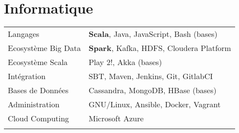 \documentclass[11pt,a4paper]{moderncv}
\begin{document}
\section{Informatique}
\begin{tabular}{ll}
  \vspace{0.1cm}
  \hspace{0.1cm} Langages & \hspace{0.5cm} \textbf{Scala}, Java, JavaScript, Bash (bases) \\ \vspace{0.1cm}
  \hspace{0.1cm} Ecosystème Big Data & \hspace{0.5cm} \textbf{Spark}, Kafka, HDFS, Cloudera Platform \\ \vspace{0.1cm}
  \hspace{0.1cm} Ecosystème Scala & \hspace{0.5cm} Play 2!, Akka (bases) \\ \vspace{0.1cm}
  \hspace{0.1cm} Intégration & \hspace{0.5cm} SBT, Maven, Jenkins, Git, GitlabCI \\ \vspace{0.1cm}
  \hspace{0.1cm} Bases de Données & \hspace{0.5cm} Cassandra, MongoDB, HBase (bases) \\ \vspace{0.1cm}
  \hspace{0.1cm} Administration & \hspace{0.5cm} GNU/Linux, Ansible, Docker, Vagrant \\ \vspace{0.1cm}
	\hspace{0.1cm} Cloud Computing & \hspace{0.5cm} Microsoft Azure \\ \vspace{0.1cm}
\end{tabular}



\newpage
\end{document}
